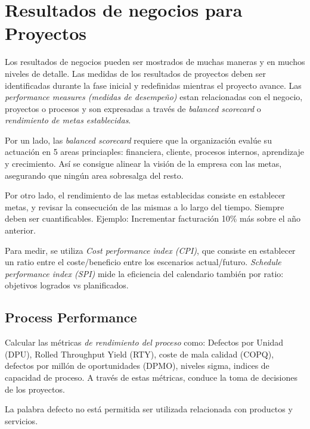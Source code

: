 \documentclass[]{article}
\begin{document}
\section{Resultados de negocios para Proyectos}

Los resultados de negocios pueden ser mostrados de muchas maneras y en muchos niveles de detalle. Las medidas de los resultados de proyectos deben ser identificadas durante la fase inicial y redefinidas mientras el proyecto avance. Las \textit{performance measures (medidas de desempeño)} estan relacionadas con el negocio, proyectos o procesos y son expresadas a través de \textit{balanced scorecard} o \textit{rendimiento de metas establecidas}.

Por un lado, las \textit{balanced scorecard} requiere que la organización evalúe su actuación en 5 areas princiaples: financiera, cliente, procesos internos, aprendizaje y crecimiento. Así se consigue alinear la visión de la empresa con las metas, asegurando que ningún area sobresalga del resto.

Por otro lado, el rendimiento de las metas establecidas consiste en establecer metas, y revisar la consecución de las mismas a lo largo del tiempo. Siempre deben ser cuantificables. Ejemplo: Incrementar facturación 10\% más sobre el año anterior.

Para medir, se utiliza \textit{Cost performance index (CPI)}, que consiste en establecer un ratio entre el coste/beneficio entre los escenarios actual/futuro. \textit{Schedule performance index (SPI)} mide la eficiencia del calendario también por ratio: objetivos logrados vs planificados.
	
\subsection{Process Performance}

Calcular las métricas \textit{de rendimiento del proceso} como: Defectos por Unidad (DPU), Rolled Throughput Yield (RTY), coste de mala calidad (COPQ), defectos por millón de oportunidades (DPMO), niveles sigma, indices de capacidad de proceso. A través de estas métricas, conduce la toma de decisiones de los proyectos.

La palabra defecto no está permitida ser utilizada relacionada con productos y servicios.
\end{document}
